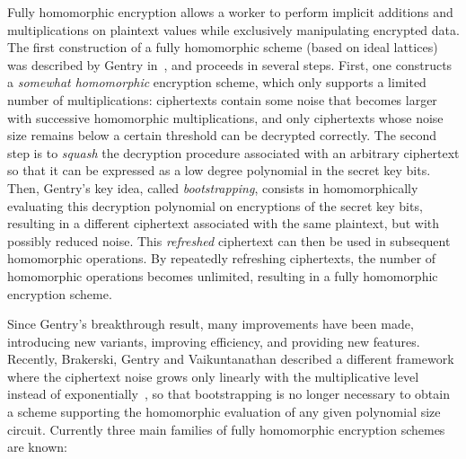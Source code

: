 \documentclass{llncs}
\begin{document}
Fully homomorphic encryption allows a worker to perform implicit
additions and multiplications on plaintext values while exclusively
manipulating encrypted data. The first construction of a fully
homomorphic scheme (based on ideal lattices) was described by Gentry
in~\cite{GenPhD}, and proceeds in several steps. First, one constructs a
\emph{somewhat homomorphic} encryption scheme, which only supports a limited
number of multiplications: ciphertexts contain some noise that becomes
larger with successive homomorphic multiplications, and only ciphertexts
whose noise size remains below a certain threshold can be decrypted
correctly. The second step is to \emph{squash} the decryption procedure
associated with an arbitrary ciphertext so that it can be expressed as a
low degree polynomial in the secret key bits. Then, Gentry's key
idea, called \emph{bootstrapping}, consists in homomorphically evaluating
this decryption polynomial on encryptions of the secret key bits,
resulting in a different ciphertext associated with the same plaintext,
but with possibly reduced noise. This \emph{refreshed} ciphertext can then
be used in subsequent homomorphic operations. By repeatedly refreshing
ciphertexts, the number of homomorphic operations becomes unlimited,
resulting in a fully homomorphic encryption scheme.

Since Gentry's breakthrough result, many improvements have been made,
introducing new variants, improving efficiency, and providing new
features. Recently, Brakerski, Gentry and Vaikuntanathan described a
different framework where the ciphertext noise grows only linearly with
the multiplicative level instead of exponentially~\cite{BGV2012}, so that
bootstrapping is no longer necessary to obtain a scheme supporting the
homomorphic evaluation of any given polynomial size circuit. Currently
three main families of fully homomorphic encryption schemes are known:
\end{document}
